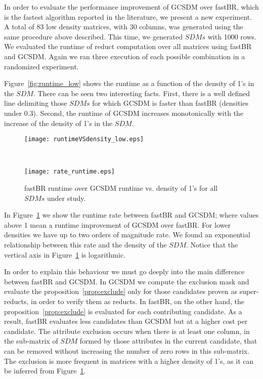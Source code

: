 \documentclass[authoryear,11pt]{elsarticle}
\begin{document}
	In order to evaluate the performance improvement of GCSDM over fastBR, which is the fastest algorithm 
	reported in the literature, we present a new experiment. A total 	of 83 low density matrices, with 30 
	columns, was generated using the same procedure above described. This time, we generated $SDMs$ with 1000 
	rows. We evaluated the runtime of reduct computation over all matrices using fastBR and GCSDM. 
	Again we ran three execution of each possible combination in a randomized experiment.
	
	Figure~\ref{fig:runtime_low} shows the runtime as a function of the density of 1's in the $SDM$.
	There can be seen two interesting facts. First, there is a well defined
	line delimiting those $SDMs$ for which GCSDM is faster than fastBR (densities under 0.3). Second, the
	runtime of GCSDM increases monotonically with the increase of the density of 1's in the $SDM$.
	
	\begin{figure}[htb]
	\begin{minipage}{.48\textwidth}
	    \begin{center}
	       \texttt{[image: runtimeVSdensity\_low.eps]}
	    \end{center}
	\caption{Fastest algorithm runtime vs. density of 1's for all $SDMs$ under study.}
	\label{fig:runtime_low}
	\end{minipage}%
	~
	\begin{minipage}{.48\textwidth}
	    \begin{center}
	       \texttt{[image: rate\_runtime.eps]}
	    \end{center}
	\caption{fastBR runtime over GCSDM runtime  vs. density of 1's for all $SDMs$ under study.}
	\label{fig:BRvsGAP}
	\end{minipage}	
	\end{figure}	
	
	In Figure~\ref{fig:BRvsGAP} we show the runtime rate between fastBR and GCSDM; where values above
	1 mean a runtime improvement of GCSDM over fastBR. For lower densities we have up to two orders of 
	magnitude rate.
	We found an exponential relationship between this rate and the density of the $SDM$. Notice that the 
	vertical axis in Figure~\ref{fig:BRvsGAP} is logarithmic.
	
	In order to explain this behaviour we must go deeply into the main difference between fastBR and GCSDM. 
	In GCSDM we compute the exclusion mask and evaluate the proposition~\ref{prop:exclude} only for those
	candidates proven as super-reducts, in order to verify them as reducts. In fastBR, on the other hand,
	the proposition~\ref{prop:exclude} is evaluated for each contributing candidate. As a result, fastBR
	evaluates less candidates than GCSDM but at a higher cost per candidate. The attribute exclusion
	occurs when there is at least one column, in the sub-matrix of $SDM$ formed by those attributes in the 
	current candidate, that can be removed without increasing the number of zero rows in this sub-matrix.
	The exclusion is more frequent in matrices with a higher density of 1's, as it can be inferred from  
	Figure~\ref{fig:BRvsGAP}. 
	
\end{document}
